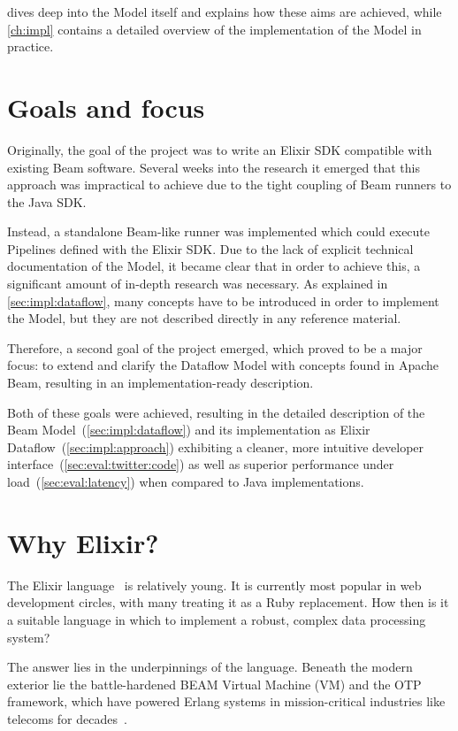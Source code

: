  dives deep into the Model itself and explains how these aims are achieved, while \cref{ch:impl} contains a detailed overview of the implementation of the Model in practice.

\section{Goals and focus}\label{sec:intro:goals}\label{sec:intro:results}

Originally, the goal of the project was to write an Elixir SDK compatible with existing Beam software.
Several weeks into the research it emerged that this approach was impractical to achieve due to the tight coupling of Beam runners to the Java SDK.

Instead, a standalone Beam-like runner was implemented which could execute Pipelines defined with the Elixir SDK.
Due to the lack of explicit technical documentation of the Model, it became clear that in order to achieve this, a significant amount of in-depth research was necessary.
As explained in \cref{sec:impl:dataflow}, many concepts have to be introduced in order to implement the Model, but they are not described directly in any reference material.

Therefore, a second goal of the project emerged, which proved to be a major focus: to extend and clarify the Dataflow Model with concepts found in Apache Beam, resulting in an implementation-ready description.

Both of these goals were achieved, resulting in the detailed description of the Beam Model~(\cref{sec:impl:dataflow}) and its implementation as Elixir Dataflow~(\cref{sec:impl:approach}) exhibiting a cleaner, more intuitive developer interface~(\cref{sec:eval:twitter:code}) as well as superior performance under load~(\cref{sec:eval:latency}) when compared to Java implementations.

\section{Why Elixir?}\label{sec:intro:elixir}

The Elixir language~\cite{Elixir} is relatively young.
It is currently most popular in web development circles, with many treating it as a Ruby replacement.
How then is it a suitable language in which to implement a robust, complex data processing system?

The answer lies in the underpinnings of the language.
Beneath the modern exterior lie the battle-hardened BEAM Virtual Machine (VM) and the OTP framework, which have powered Erlang systems in mission-critical industries like telecoms for decades~\cite[p.~383]{scalability_erlang_otp}.

